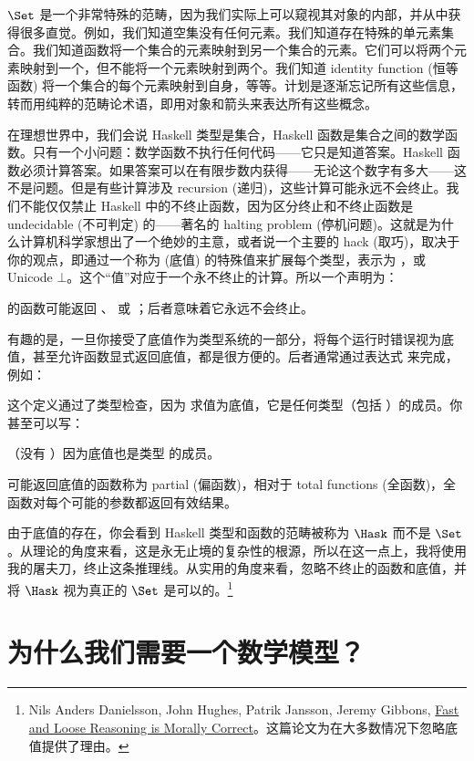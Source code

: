 $\Set$ 是一个非常特殊的范畴，因为我们实际上可以窥视其对象的内部，并从中获得很多直觉。例如，我们知道空集没有任何元素。我们知道存在特殊的单元素集合。我们知道函数将一个集合的元素映射到另一个集合的元素。它们可以将两个元素映射到一个，但不能将一个元素映射到两个。我们知道 identity function (恒等函数) 将一个集合的每个元素映射到自身，等等。计划是逐渐忘记所有这些信息，转而用纯粹的范畴论术语，即用对象和箭头来表达所有这些概念。

在理想世界中，我们会说 Haskell 类型是集合，Haskell 函数是集合之间的数学函数。只有一个小问题：数学函数不执行任何代码——它只是知道答案。Haskell 函数必须计算答案。如果答案可以在有限步数内获得——无论这个数字有多大——这不是问题。但是有些计算涉及 recursion (递归)，这些计算可能永远不会终止。我们不能仅仅禁止 Haskell 中的不终止函数，因为区分终止和不终止函数是 undecidable (不可判定) 的——著名的 halting problem (停机问题)。这就是为什么计算机科学家想出了一个绝妙的主意，或者说一个主要的 hack (取巧)，取决于你的观点，即通过一个称为  (底值) 的特殊值来扩展每个类型，表示为 \code{\_|\_}，或 Unicode $\bot$。这个“值”对应于一个永不终止的计算。所以一个声明为：

的函数可能返回 、 或 \code{\_|\_}；后者意味着它永远不会终止。

有趣的是，一旦你接受了底值作为类型系统的一部分，将每个运行时错误视为底值，甚至允许函数显式返回底值，都是很方便的。后者通常通过表达式  来完成，例如：

这个定义通过了类型检查，因为  求值为底值，它是任何类型（包括 ）的成员。你甚至可以写：

（没有 ）因为底值也是类型  的成员。

可能返回底值的函数称为 partial (偏函数)，相对于 total functions (全函数)，全函数对每个可能的参数都返回有效结果。

由于底值的存在，你会看到 Haskell 类型和函数的范畴被称为 $\Hask$ 而不是 $\Set$。从理论的角度来看，这是永无止境的复杂性的根源，所以在这一点上，我将使用我的屠夫刀，终止这条推理线。从实用的角度来看，忽略不终止的函数和底值，并将 $\Hask$ 视为真正的 $\Set$ 是可以的。\footnote{Nils Anders Danielsson, John Hughes, Patrik Jansson, Jeremy Gibbons, \href{http://www.cs.ox.ac.uk/jeremy.gibbons/publications/fast+loose.pdf}{Fast and Loose Reasoning is Morally Correct}。这篇论文为在大多数情况下忽略底值提供了理由。}

\section{为什么我们需要一个数学模型？}

